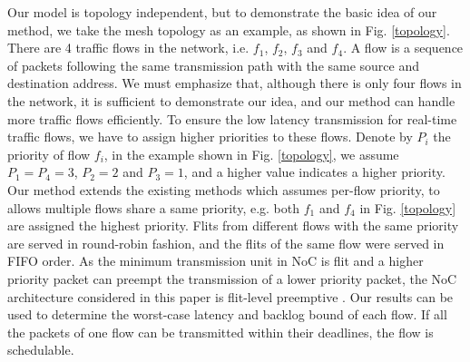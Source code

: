 \documentclass[10pt,journal]{IEEEtran}
\begin{document}
Our model is topology independent, but to demonstrate the basic idea of our method, we take the mesh topology as an example, as shown in Fig. \ref{topology}. There are 4 traffic flows in the network, i.e. $f_1$, $f_2$, $f_3$ and $f_4$. A flow is a sequence of packets following the same transmission path with the same source and destination address. We must emphasize that, although there is only four flows in the network, it is sufficient to demonstrate our idea, and our method can handle more traffic flows efficiently. To ensure the low latency transmission for real-time traffic flows, we have to assign higher priorities to these flows. Denote by $P_i$ the priority of flow $f_i$, in the example shown in Fig. \ref{topology}, we assume $P_1=P_4=3$, $P_2=2$ and $P_3=1$, and a higher value indicates a higher priority. Our method extends the existing methods \cite{73}\cite{Qian489900} which assumes per-flow priority, to allows multiple flows share a same priority, e.g. both $f_1$ and $f_4$ in Fig. \ref{topology} are assigned the highest priority. Flits from different flows with the same priority are served in round-robin fashion, and the flits of the same flow were served in FIFO order. As the minimum transmission unit in NoC is flit and a higher priority packet can preempt the transmission of a lower priority packet, the NoC architecture considered in this paper is flit-level preemptive \cite{Lee:2003:RWC:846077.846083}. Our results can be used to determine the worst-case latency and backlog bound of each flow. If all the packets of one flow can be transmitted within their deadlines, the flow is schedulable.
\end{document}
